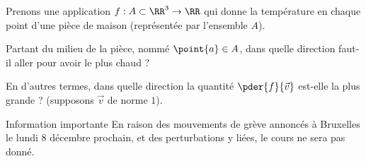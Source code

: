 \begin{frame}
  \begin{example}
    Prenons une application \(f : A\subset \RR^3 \to \RR\) qui donne la température en chaque point d'une pièce de maison\pause{} (représentée par l'ensemble \(A\))\pause{}.

    Partant du milieu de la pièce, nommé \(\point{a}\in A\),\pause{} dans quelle direction faut-il aller pour avoir le plus chaud ?\pause{}

    En d'autres termes, dans quelle direction la quantité \(\pder{f}{\vec{v}}\)\pause{} est-elle la plus grande ?\pause{} (supposons \(\vec{v}\) de norme \(1\)).
  \end{example}
\end{frame}
\begin{frame}
\end{frame}
\begin{frame}{Information importante}
  En raison des mouvements de grève annoncés à Bruxelles le lundi 8 décembre prochain, et des perturbations y liées, le cours ne sera pas donné.
\end{frame}
